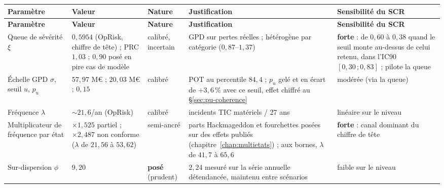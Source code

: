 \vspace{0.25cm}
{\footnotesize
\renewcommand{\arraystretch}{1.28}
\begin{longtable}{@{}>{\raggedright\arraybackslash}p{2.7cm}
                    >{\raggedright\arraybackslash}p{2.6cm}
                    >{\raggedright\arraybackslash}p{1.7cm}
                    >{\raggedright\arraybackslash}p{4.0cm}
                    >{\raggedright\arraybackslash}p{3.6cm}@{}}
\toprule
\textbf{Paramètre} & \textbf{Valeur} & \textbf{Nature} & \textbf{Justification} & \textbf{Sensibilité du SCR} \\
\midrule
\endfirsthead
\toprule
\textbf{Paramètre} & \textbf{Valeur} & \textbf{Nature} & \textbf{Justification} & \textbf{Sensibilité du SCR} \\
\midrule
\endhead
\bottomrule
\endlastfoot
Queue de sévérité $\xi$ & $0{,}5954$ (OpRisk, chiffre de tête) ; PRC $1{,}03$ ; $0{,}90$ posé en pire cas de modèle & calibré, incertain & GPD sur pertes réelles ; hétérogène par catégorie ($0{,}87$--$1{,}37$) & \textbf{forte} : de $0{,}60$ à $0{,}38$ quand le seuil monte au-dessus de celui retenu, dans l'IC90 $[0{,}30\,;0{,}83]$ ; pilote la queue \\
Échelle GPD $\sigma$, seuil $u$, $p_u$ & $57{,}97$ M\euro{} ; $20{,}03$ M\euro{} ; $0{,}15$ & calibré & POT au percentile $84{,}4$ ; $p_u$ gelé et en écart de $+3{,}6\,\%$ avec ce seuil, effet chiffré au \S\ref{sec:pu-coherence} & modérée (via la queue) \\
Fréquence $\lambda$ & ${\sim}21{,}6$/an (OpRisk) & calibré & incidents TIC matériels / 27 ans & linéaire sur le niveau \\
Multiplicateur de fréquence par état & $\times 1{,}525$ partiel ; $\times 2{,}487$ non conforme ($\lambda$ de $21{,}56$ à $53{,}62$) & semi-ancré & parts Hackmageddon et fourchettes posées sur des effets publiés (chapitre~\ref{chap:multietats}) ; aux bornes, $\lambda$ de $41{,}7$ à $65{,}6$ & \textbf{forte} : canal dominant du chiffre de tête \\
Sur-dispersion $\phi$ & $9{,}20$ & \textbf{posé} (prudent) & $2{,}24$ mesuré sur la série annuelle détendancée, maintenu entre scénarios & faible sur le niveau \\

\end{longtable}}
